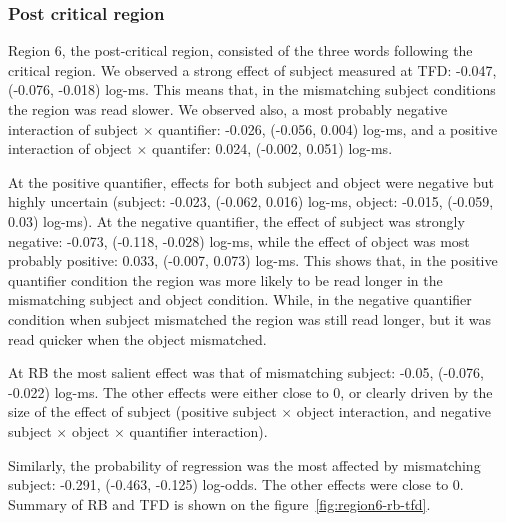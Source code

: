 

\subsubsection{Post critical region}

Region 6, the post-critical region, consisted of the three words following the critical region.
We observed a strong effect of subject measured at TFD: -0.047, (-0.076, -0.018) log-ms. This means that, in the mismatching subject conditions the region was read slower. We observed also, a most probably negative interaction of subject $\times$ quantifier: -0.026, (-0.056, 0.004) log-ms, and a positive interaction of object $\times$ quantifer: 0.024, (-0.002, 0.051) log-ms.

At the positive quantifier, effects for both subject and object were negative but highly uncertain (subject: -0.023, (-0.062, 0.016) log-ms, object: -0.015, (-0.059, 0.03) log-ms). At the negative quantifier, the effect of subject was strongly negative: -0.073, (-0.118, -0.028) log-ms, while the effect of object was most probably positive: 0.033, (-0.007, 0.073) log-ms.
This shows that, in the positive quantifier condition the region was more likely to be read longer in the mismatching subject and object condition. While, in the negative quantifier condition when subject mismatched the region was still read longer, but it was read quicker when the object mismatched.

At RB the most salient effect was that of mismatching subject: -0.05, (-0.076, -0.022) log-ms. The other effects were either close to 0, or clearly driven by the size of the effect of subject (positive subject $\times$ object interaction, and negative subject $\times$ object $\times$ quantifier interaction).

Similarly, the probability of regression was the most affected by mismatching subject: -0.291, (-0.463, -0.125) log-odds. The other effects were close to 0.
Summary of RB and TFD is shown on the figure~\ref{fig:region6-rb-tfd}.

